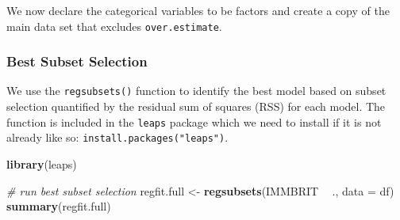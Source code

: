 \documentclass[]{article}
\newenvironment{Shaded}{\begin{snugshade}}{\end{snugshade}}
\newcommand{\CommentTok}[1]{\textcolor[rgb]{0.56,0.35,0.01}{\textit{#1}}}
\newcommand{\DataTypeTok}[1]{\textcolor[rgb]{0.13,0.29,0.53}{#1}}
\newcommand{\KeywordTok}[1]{\textcolor[rgb]{0.13,0.29,0.53}{\textbf{#1}}}
\newcommand{\NormalTok}[1]{#1}
\newcommand{\OperatorTok}[1]{\textcolor[rgb]{0.81,0.36,0.00}{\textbf{#1}}}
\newcommand{\OtherTok}[1]{\textcolor[rgb]{0.56,0.35,0.01}{#1}}
\newcommand{\StringTok}[1]{\textcolor[rgb]{0.31,0.60,0.02}{#1}}
\begin{document}
We now declare the categorical variables to be factors and create a copy of the main data set that excludes \texttt{over.estimate}.

\begin{Shaded}
\end{Shaded}

\hypertarget{best-subset-selection}{%
\subsubsection{Best Subset Selection}\label{best-subset-selection}}

We use the \texttt{regsubsets()} function to identify the best model based on subset selection quantified by the residual sum of squares (RSS) for each model. The function is included in the \texttt{leaps} package which we need to install if it is not already like so: \texttt{install.packages("leaps")}.

\begin{Shaded}
\begin{Highlighting}[]
\KeywordTok{library}\NormalTok{(leaps)}

\CommentTok{# run best subset selection}
\NormalTok{regfit.full <-}\StringTok{ }\KeywordTok{regsubsets}\NormalTok{(IMMBRIT }\OperatorTok{~}\StringTok{ }\NormalTok{., }\DataTypeTok{data =}\NormalTok{ df)}
\KeywordTok{summary}\NormalTok{(regfit.full)}
\end{Highlighting}
\end{Shaded}
\end{document}
